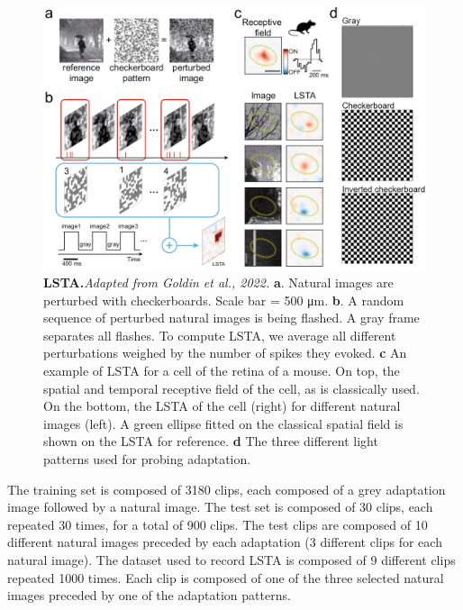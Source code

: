 \begin{figure}
    \centering
    \includegraphics[width=\textwidth]{pics/LSTAExplainV3.png}
    \caption{\textbf{LSTA.}\textit{Adapted from Goldin et al., 2022.} \textbf{a}.
        Natural images are
        perturbed with checkerboards. Scale bar = 500 μm. \textbf{b}. A random sequence
        of
        perturbed natural
        images is being flashed. A gray frame separates all flashes. To compute
        LSTA, we average all different
        perturbations weighed by the number of spikes they evoked. \textbf{c} An example
        of
        LSTA for a cell of the
        retina of a mouse. On top, the spatial and temporal receptive field of
        the
        cell, as is classically used. On
        the bottom, the LSTA of the cell (right) for different natural images
        (left). A green ellipse fitted on
        the classical spatial field is shown on the LSTA for reference. \textbf{d} The three different light patterns used for probing adaptation. }
    \label{fig:LSTA}
\end{figure}

The training set is composed of 3180 clips, each composed of a grey
adaptation image followed by a natural image. The test set is composed of 30
clips, each repeated 30 times, for a total of 900 clips.
The test clips are composed of 10 different natural
images preceded by each adaptation (3 different clips for each natural image).
The dataset used to record LSTA is composed of 9 different clips repeated 1000
times. Each clip is composed of one of the three selected natural images
preceded by one of the adaptation patterns.

